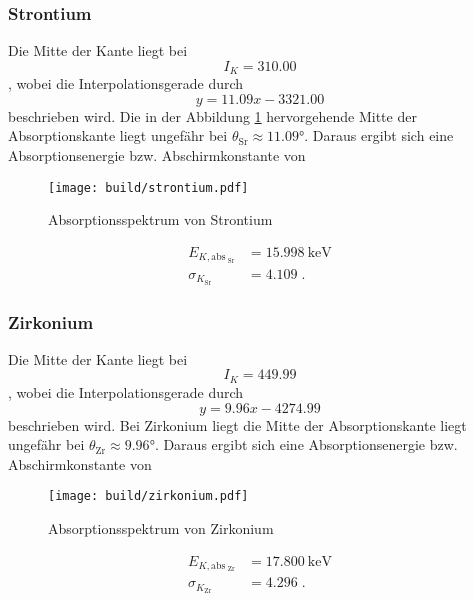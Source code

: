 \subsubsection{Strontium}
Die Mitte der Kante liegt bei 
\begin{equation*}
    I_K = 310.00
\end{equation*}
, wobei die Interpolationsgerade durch 
\begin{equation*}
    y = 11.09x -3321.00
\end{equation*}
beschrieben wird.
Die in der Abbildung \ref{fig:Strontium} hervorgehende Mitte der Absorptionskante liegt ungefähr bei $\theta_\text{Sr} \approx \ang{11.09;;}$. 
Daraus ergibt sich eine Absorptionsenergie bzw. Abschirmkonstante von 
\begin{figure}
    \centering
    \caption{Absorptionsspektrum von Strontium}
    \label{fig:Strontium}
    \texttt{[image: build/strontium.pdf]}
\end{figure}
\begin{align*}
    E_{K, \text{abs}_\text{ Sr}}  &= \SI{15.998}{\kilo\electronvolt} \\
    \sigma_{K_\text{Sr}}         &= \num{4.109} \; \text{.}
\end{align*}
\FloatBarrier
\subsubsection{Zirkonium}
Die Mitte der Kante liegt bei 
\begin{equation*}
    I_K =  449.99
\end{equation*}
, wobei die Interpolationsgerade durch 
\begin{equation*}
    y = 9.96x -4274.99
\end{equation*}
beschrieben wird.
Bei Zirkonium liegt die Mitte der Absorptionskante liegt ungefähr bei $\theta_\text{Zr} \approx \ang{9.96;;}$. 
Daraus ergibt sich eine Absorptionsenergie bzw. Abschirmkonstante von 
\begin{figure}
    \centering
    \caption{Absorptionsspektrum von Zirkonium}
    \label{fig:Zirkonium}
    \texttt{[image: build/zirkonium.pdf]}
\end{figure}
\begin{align*}
    E_{K, \text{abs}_\text{ Zr}}  &= \SI{17.800}{\kilo\electronvolt} \\
    \sigma_{K_\text{Zr}}         &= \num{4.296} \; \text{.}
\end{align*}
\FloatBarrier
